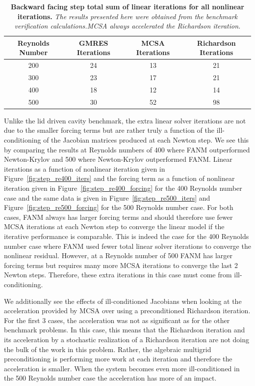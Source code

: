 \begin{table}[h!]
  \begin{center}
    \begin{tabular}{cccc}\hline\hline
      \multicolumn{1}{c}{Reynolds Number}& 
      \multicolumn{1}{c}{GMRES Iterations}&
      \multicolumn{1}{c}{MCSA Iterations}&
      \multicolumn{1}{c}{Richardson Iterations}\\
      \hline
      200 & 24 & 13 & 21\\
      300 & 23 & 17 & 21\\
      400 & 18 & 12 & 14\\
      500 & 30 & 52 & 98\\
      \hline\hline
    \end{tabular}
  \end{center}
  \caption{\textbf{Backward facing step total sum of linear iterations
      for all nonlinear iterations.} \textit{The results presented
      here were obtained from the benchmark verification
      calculations.MCSA always accelerated the Richardson iteration.}}
  \label{tab:step_linear_iter_comparison}
\end{table}

Unlike the lid driven cavity benchmark, the extra linear solver
iterations are not due to the smaller forcing terms but are rather
truly a function of the ill-conditioning of the Jacobian matrices
produced at each Newton step. We see this by comparing the results at
Reynolds numbers of 400 where FANM outperformed Newton-Krylov and 500
where Newton-Krylov outperformed FANM. Linear iterations as a function
of nonlinear iteration given in Figure~\ref{fig:step_re400_iters} and
the forcing term as a function of nonlinear iteration given in
Figure~\ref{fig:step_re400_forcing} for the 400 Reynolds number case
and the same data is given in Figure~\ref{fig:step_re500_iters} and
Figure~\ref{fig:step_re500_forcing} for the 500 Reynolds number
case. For both cases, FANM always has larger forcing terms and should
therefore use fewer MCSA iterations at each Newton step to converge
the linear model if the iterative performance is comparable. This is
indeed the case for the 400 Reynolds number case where FANM used fewer
total linear solver iterations to converge the nonlinear
residual. However, at a Reynolds number of 500 FANM has larger forcing
terms but requires many more MCSA iterations to converge the last 2
Newton steps. Therefore, these extra iterations in this case must come
from ill-conditioning.

We additionally see the effects of ill-conditioned Jacobians when
looking at the acceleration provided by MCSA over using a
preconditioned Richardson iteration. For the first 3 cases, the
acceleration was not as significant as for the other benchmark
problems. In this case, this means that the Richardson iteration and
its acceleration by a stochastic realization of a Richardson iteration
are not doing the bulk of the work in this problem. Rather, the
algebraic multigrid preconditioning is performing more work at each
iteration and therefore the acceleration is smaller. When the system
becomes even more ill-conditioned in the 500 Reynolds number case
the acceleration has more of an impact.

